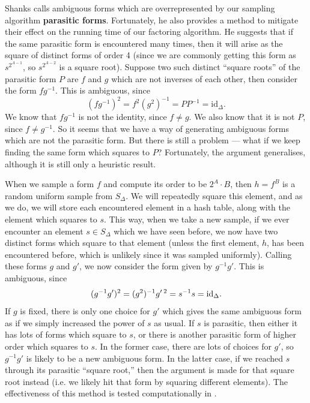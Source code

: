 \documentclass[honours,12pt]{unswthesis}
\numberwithin{equation}{section}
\begin{document}
Shanks calls ambiguous forms which are overrepresented by our sampling algorithm \textbf{parasitic forms}.
Fortunately, he also provides a method to mitigate their effect on the running time of our factoring algorithm.
He suggests that if the same parasitic form is encountered many times, then it will arise as the square of distinct forms of order 4 (since we are commonly getting this form as $s^{2^{A-1}}$, so $s^{2^{A-2}}$ is a square root).
Suppose two such distinct ``square roots'' of the parasitic form $P$ are $f$ and $g$ which are not inverses of each other, then consider the form $fg^{-1}$.
This is ambiguous, since
$$(fg^{-1})^2 = f^2 (g^2)^{-1} = PP^{-1}  = \text{id}_\Delta.$$
We know that $fg^{-1}$ is not the identity, since $f \neq g$.
We also know that it is not $P$, since $f \neq g^{-1}$.
So it seems that we have a way of generating ambiguous forms which are not the parasitic form.
But there is still a problem ---
what if we keep finding the same form which squares to $P$?
Fortunately, the argument generalises, although it is still only a heuristic result.

When we sample a form $f$ and compute its order to be $2^A \cdot B$, then $h = f^B$ is a random uniform sample from $S_\Delta$.
We will repeatedly square this element, and as we do, we will store each encountered element in a hash table, along with the element which squares to $s$.
This way, when we take a new sample, if we ever encounter an element $s \in S_\Delta$ which we have seen before, we now have two distinct forms which square to that element (unless the first element, $h$, has been encountered before, which is unlikely since it was sampled uniformly).
Calling these forms $g$ and $g'$, we now consider the form given by $g^{-1}g'$.
This is ambiguous, since
$$(g^{-1}g')^2 = (g^2)^{-1}g'\hspace{0.5mm}^2 = s^{-1}s = \text{id}_\Delta.$$
If $g$ is fixed, there is only one choice for $g'$ which gives the same ambiguous form as if we simply increased the power of $s$ as usual.
If $s$ is parasitic, then either it has lots of forms which square to $s$, or there is another parasitic form of higher order which squares to $s$.
In the former case, there are lots of choices for $g'$, so $g^{-1}g'$ is likely to be a new ambiguous form.
In the latter case, if we reached $s$ through its parasitic ``square root,'' then the argument is made for that square root instead (i.e. we likely hit that form by squaring different elements).
The effectiveness of this method is tested computationally in .
\end{document}
